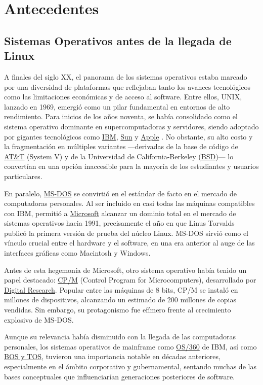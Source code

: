 \documentclass[a4paper,12pt]{article}
\begin{document}
\section{Antecedentes} 

\subsection{Sistemas Operativos antes de la llegada de Linux}
A finales del siglo XX, el panorama de los sistemas operativos estaba marcado
por una diversidad de plataformas que reflejaban tanto los avances tecnológicos
como las limitaciones económicas y de acceso al software. Entre ellos,
UNIX, lanzado en 1969, emergió como un pilar fundamental en
entornos de alto rendimiento. Para inicios de los años noventa, se había
consolidado como el sistema operativo dominante en supercomputadoras y
servidores, siendo adoptado por gigantes tecnológicos como \hyperlink{ibm}{IBM},
\hyperlink{sun}{Sun} y \hyperlink{apple}{Apple} .  No obstante, su alto costo y la
fragmentación en múltiples variantes —derivadas de la base de código de
\hyperlink{att}{AT\&T} (System V) y de la Universidad de California-Berkeley
(\hyperlink{bsd}{BSD})— lo convertían en una opción inaccesible para la mayoría
de los estudiantes y usuarios particulares.

En paralelo, \hyperlink{msdos}{MS-DOS} se convirtió en el estándar de facto en el
mercado de computadoras personales. Al ser incluido en casi todas las máquinas
compatibles con IBM, permitió a \hyperlink{microsoft}{Microsoft}
alcanzar un dominio total en el mercado de sistemas operativos hacia 1991,
precisamente el año en que Linus Torvalds publicó la primera versión de prueba
del núcleo Linux. MS-DOS sirvió como el vínculo crucial entre
el hardware y el software, en una era anterior al auge de las interfaces
gráficas como Macintosh y Windows.

Antes de esta hegemonía de Microsoft, otro sistema operativo había tenido un
papel destacado: \hyperlink{cpm}{CP/M} (Control Program for Microcomputers),
desarrollado por \hyperlink{digitalresearch}{Digital Research}. Popular entre las
máquinas de 8 bits, CP/M se instaló en millones de dispositivos,
alcanzando un estimado de 200 millones de copias vendidas. Sin embargo, su
protagonismo fue efímero frente al crecimiento explosivo de
MS-DOS.

Aunque su relevancia había disminuido con la llegada de las computadoras
personales, los sistemas operativos de mainframe como \hyperlink{os360}{OS/360}
de IBM, así como \hyperlink{bostos}{BOS y TOS}, tuvieron una
importancia notable en décadas anteriores, especialmente en el ámbito
corporativo y gubernamental, sentando muchas de las bases conceptuales que
influenciarían generaciones posteriores de software.
\end{document}
